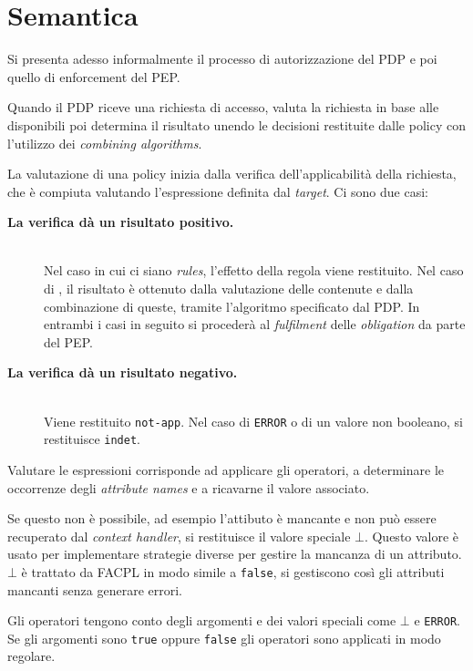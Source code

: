 \section{Semantica}
\label{sec:sem_fpl}
Si presenta adesso informalmente il processo di autorizzazione del \ac{PDP} e poi quello di enforcement del \ac{PEP}.\par
Quando il \ac{PDP} riceve una richiesta di accesso, valuta la richiesta in base alle \epolicy disponibili poi determina
il risultato unendo le decisioni restituite dalle policy con l'utilizzo dei \emph{combining algorithms}.\par
La valutazione di una policy inizia dalla verifica dell'applicabilità della richiesta, che è compiuta valutando
l'espressione definita dal \emph{target}. Ci sono due casi:
\begin{description}
  \item[\normalfont\bfseries{\MakeUppercase{L}a verifica dà un risultato positivo.}] \hfill \\
        Nel caso in cui ci siano \emph{rules}, l'effetto della regola viene restituito.
        Nel caso di \ePolicySet, il risultato è ottenuto dalla valutazione delle \epolicy contenute e dalla combinazione di queste,
        tramite l'algoritmo specificato dal \ac{PDP}. In entrambi i casi in seguito si procederà al \emph{fulfilment} delle
        \emph{obligation} da parte del \ac{PEP}.
  \item[\normalfont\bfseries{\MakeUppercase{L}a verifica dà un risultato negativo.}] \hfill \\
        Viene restituito \texttt{not-app}. Nel caso di \texttt{ERROR} o di un valore non booleano,
        si restituisce \texttt{indet}.
\end{description}
Valutare le espressioni corrisponde ad applicare gli operatori, a determinare le occorrenze degli \emph{attribute names} e
a ricavarne il valore associato.\par
Se questo non è possibile, ad esempio l'attibuto è mancante e non può essere recuperato dal \emph{context handler}, si
restituisce il valore speciale $\bot$. Questo valore è usato per implementare strategie diverse per gestire
la mancanza di un attributo. $\bot$ è trattato da \ac{FACPL} in modo simile a \texttt{false}, si gestiscono
così gli attributi mancanti senza generare errori.\par
Gli operatori tengono conto degli argomenti e dei valori speciali come $\bot$ e \texttt{ERROR}.
Se gli argomenti sono \texttt{true} oppure \texttt{false} gli operatori sono applicati in modo regolare.
